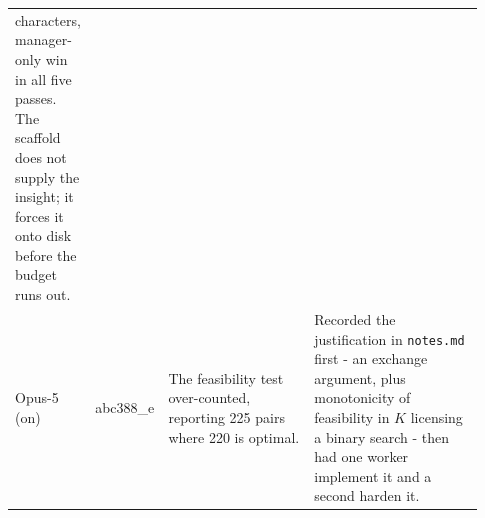 \documentclass{article}
\begin{document}
\begin{table}[p]
\begin{tabular}{@{}p{0.155\linewidth}p{0.101\linewidth}p{0.310\linewidth}p{0.364\linewidth}@{}}
characters, manager-only win in all five passes. The scaffold does not supply the insight; it forces
it onto disk before the budget runs out. \\
\addlinespace
Opus-5 \newline (on) & abc388\_e & The feasibility test over-counted, reporting 225 pairs where 220
is optimal. & Recorded the justification in \texttt{notes.md} first - an exchange argument,
plus monotonicity of feasibility in $K$ licensing a binary search - then had one worker implement
it and a second harden it. \\
\bottomrule
\end{tabular}
\end{table}








\end{document}
